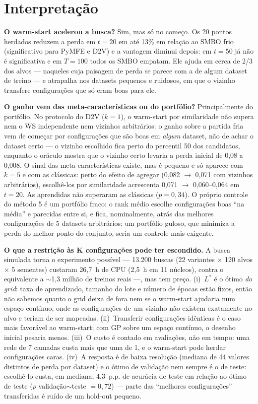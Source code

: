 \documentclass[10pt,a4paper]{article}
\begin{document}
\section{Interpretação}

\textbf{O warm-start acelerou a busca?} Sim, mas só no começo. Os 20 pontos herdados reduzem a perda em $t = 20$ em até 13\% em
relação ao SMBO frio (significativo para PyMFE e D2V) e a vantagem diminui depois: em $t = 50$ já não é significativa e em
$T = 100$ todos os SMBO empatam. Ele ajuda em cerca de 2/3 dos alvos --- naqueles cuja paisagem de perda se parece com a de algum
dataset de treino --- e atrapalha nos datasets pequenos e ruidosos, em que o vizinho transfere configurações que só eram boas
para ele.

\textbf{O ganho vem das meta-características ou do portfólio?} Principalmente do portfólio. No protocolo do D2V ($k = 1$), o
warm-start por similaridade não supera nem o WS independente nem vizinhos arbitrários: o ganho sobre a partida fria vem de começar
por configurações que são boas em \textit{algum} dataset, não de achar o dataset certo --- o vizinho escolhido fica perto do
percentil 50 dos candidatos, enquanto o oráculo mostra que o vizinho certo levaria a perda inicial de 0,08 a 0,008. O sinal das
meta-características existe, mas é pequeno e só aparece com $k = 5$ e com as clássicas: perto do efeito de agregar
(0,082 $\rightarrow$ 0,071 com vizinhos arbitrários), escolhê-los por similaridade acrescenta 0,071 $\rightarrow$ 0,060--0,064 em
$t = 20$. As aprendidas não superaram as clássicas ($p = 0,34$). O próprio controle do método 5 é um portfólio fraco: o rank
médio escolhe configurações boas ``na média'' e parecidas entre si, e fica, nominalmente, atrás das melhores configurações de 5
datasets arbitrários; um portfólio guloso, que minimiza a perda do melhor ponto do conjunto, seria um controle mais exigente.

\textbf{O que a restrição às $\boldsymbol{K}$ configurações pode ter escondido.} A busca simulada torna o experimento possível ---
13.200 buscas (22 variantes $\times$ 120 alvos $\times$ 5 sementes) custaram 26,7~h de CPU (2,5~h em 11 núcleos), contra o
equivalente a $\sim$1,3 milhão de treinos reais ---, mas tem preço. (i)~$L^*$ é o ótimo \textit{do grid}: taxa de aprendizado,
tamanho do lote e número de épocas estão fixos, então não sabemos quanto o grid deixa de fora nem se o warm-start ajudaria num
espaço contínuo, onde as configurações de um vizinho não existem exatamente no alvo e teriam de ser mapeadas. (ii)~Transferir
configurações idênticas é o caso mais favorável ao warm-start; com GP sobre um espaço contínuo, o desenho inicial pesaria menos.
(iii)~O custo é contado em avaliações, não em tempo: uma rede de 7 camadas custa mais que uma de 1, e o warm-start pode herdar
configurações caras. (iv)~A resposta é de baixa resolução (mediana de 44 valores distintos de perda por dataset) e o ótimo de
validação nem sempre é o de teste: escolhê-lo custa, em mediana, 4,3~p.p. de acurácia de teste em relação ao ótimo de teste
($\rho$ validação$\sim$teste $= 0,72$) --- parte das ``melhores configurações'' transferidas é ruído de um hold-out pequeno.
\end{document}
